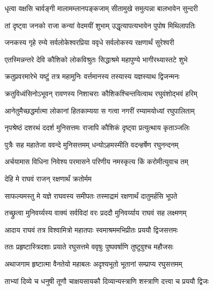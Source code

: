 \twolineshloka
{धृत्वा वक्षसि चार्वङ्गी मालामम्लानपङ्कजाम्}
{सीतामुखे समुत्पन्ना बालभावेन सुन्दरी}%

\twolineshloka
{तां दृष्ट्वा जनको राजा कन्यां वेदमयीं शुभाम्}
{उद्धृत्यापत्यभावेन पुपोष मिथिलापतिः}%

\twolineshloka
{जनकस्य गृहे रम्ये सर्वलोकेश्वरप्रिया}
{ववृधे सर्वलोकस्य रक्षणार्थं सुरेश्वरी}%

\twolineshloka
{एतस्मिन्नन्तरे देवि कौशिको लोकविश्रुतः}
{सिद्धाश्रमे महापुण्ये भागीरथ्यास्तटे शुभे}%

\twolineshloka
{क्रतुप्रवरमारेभे यष्टुं तत्र महामुनिः}
{वर्त्तमानस्य तस्यास्य यज्ञस्याथ द्विजन्मनः}%

\twolineshloka
{क्रतुविध्वंसिनोऽभूवन् रावणस्य निशाचराः}
{कौशिकश्चिन्तयित्वाथ रघुवंशोद्भवं हरिम्}%

\twolineshloka
{आनेतुमैच्छद्धर्मात्मा लोकानां हितकाम्यया}
{स गत्वा नगरीं रम्यामयोध्यां रघुपालिताम्}%

\twolineshloka
{नृपश्रेष्ठं दशरथं ददर्श मुनिसत्तमः}
{राजापि कौशिकं दृष्ट्वा प्रत्युत्थाय कृताञ्जलिः}%

\twolineshloka
{पुत्रैः सह महातेजा ववन्दे मुनिसत्तमम्}
{धन्योऽहमस्मीति वदन्हर्षेण रघुनन्दनम्}%

\twolineshloka
{अर्चयामास विधिना निवेश्य परमासने}
{परिणीय नमस्कृत्य किं करोमीत्युवाच तम्}%


\onelineshloka
{देहि मे राघवं राजन् रक्षणार्थं क्रतोर्मम}%

\twolineshloka
{साफल्यमस्तु मे यज्ञे राघवस्य समीपतः}
{तस्माद्रामं रक्षणार्थं दातुमर्हसि भूपते}%


\twolineshloka
{तच्छ्रुत्वा मुनिवर्य्यस्य वाक्यं सर्वविदां वरः}
{प्रददौ मुनिवर्य्याय राघवं सह लक्ष्मणम्}%

\twolineshloka
{आदाय राघवं तत्र विश्वामित्रो महातपाः}
{स्वमाश्रममभिप्रीतः प्रययौ द्विजसत्तमः}%

\twolineshloka
{ततः प्रहृष्टास्त्रिदशाः प्रयाते रघुसत्तमे}
{ववृषुः पुष्पवर्षाणि तुष्टुवुश्च महौजसः}%

\twolineshloka
{अथाजगाम हृष्टात्मा वैनतेयो महाबलः}
{अदृश्यभूतो भूतानां सम्प्राप्य रघुसत्तमम्}%

\twolineshloka
{ताभ्यां दिव्ये च धनुषी तूणौ चाक्षयसायकौ}
{दिव्यान्यस्त्राणि शस्त्राणि दत्त्वा च प्रययौ द्विजः}%

